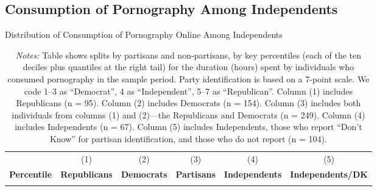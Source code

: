 \documentclass[12pt, letterpaper]{article}
\begin{document}
\FloatBarrier
\clearpage
\subsection{Consumption of Pornography Among Independents}
\label{si:independents}
\begin{table}[ht] \centering \small \setlength\tabcolsep{6 pt}
	\caption{Distribution of Consumption of Pornography Online Among Independents}
	\label{tab:percentiles_duration_adultsites_by_individuals_independents_partisans}
	\begin{adjustbox}{max width=\textwidth}
		\begin{tabular}{@{\hspace{0\tabcolsep}}crrrrr@{\hspace{0\tabcolsep}}}
			\toprule		
			&\multicolumn{1}{c}{(1)}&\multicolumn{1}{c}{(2)}&\multicolumn{1}{c}{(3)}&\multicolumn{1}{c}{(4)}&\multicolumn{1}{c}{(5)}\\	
			\multicolumn{1}{l}{\textbf{Percentile}}&\multicolumn{1}{c}{\textbf{Republicans}}&\multicolumn{1}{c}{\textbf{Democrats}}&\multicolumn{1}{c}{\textbf{Partisans}}&\multicolumn{1}{c}{\textbf{Independents}}&\multicolumn{1}{r}{\textbf{Independents/DK}}\\
			\midrule
			\\
			\bottomrule
		\end{tabular}
	\end{adjustbox}
	\caption*{\footnotesize \emph{Notes:} 
		Table shows splits by partisans and non-partisans, by key percentiles (each of the ten deciles plus quantiles at the right tail) for the duration (hours) spent by individuals who consumed pornography in the sample period. 
		Party identification is based on a 7-point scale. We code 1--3 as ``Democrat'', 4 as ``Independent'', 5--7 as ``Republican''.
		Column (1) includes Republicans (n = 95).		
		Column (2) includes Democrats (n = 154).
		Column (3) includes both individuals from columns (1) and (2)---the Republicans and Democrats (n = 249).
		Column (4) includes Independents (n = 67).
		Column (5) includes Independents, those who report ``Don't Know'' for partisan identification, and those who do not report (n = 104).
	}
\end{table}
\end{document}
